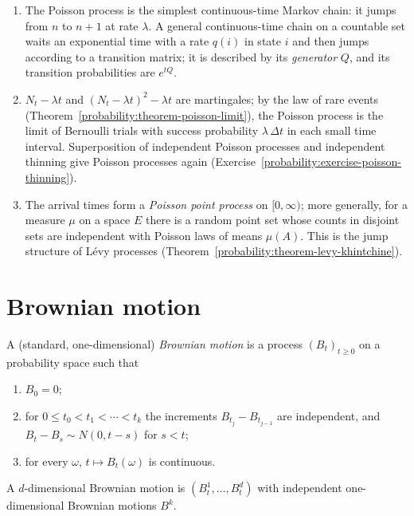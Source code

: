 \begin{remark}\label{martingales:remark-poisson-process}
\begin{enumerate}
\item The Poisson process is the simplest continuous-time Markov chain: it jumps from $n$ to $n + 1$ at rate $\lambda$. A general continuous-time chain on a countable set waits an exponential time with a rate $q(i)$ in state $i$ and
then jumps according to a transition matrix; it is described by its \emph{generator} $Q$, and its transition probabilities are $e^{tQ}$.
\item $N_t - \lambda t$ and $(N_t - \lambda t)^2 - \lambda t$ are martingales; by the law of rare events (Theorem~\ref{probability:theorem-poisson-limit}), the Poisson process is the limit of Bernoulli trials with success probability
$\lambda\,\Delta t$ in each small time interval. Superposition of independent Poisson processes and independent thinning give Poisson processes again (Exercise~\ref{probability:exercise-poisson-thinning}).
\item The arrival times form a \emph{Poisson point process} on $[0, \infty)$; more generally, for a measure $\mu$ on a space $E$ there is a random point set whose counts in disjoint sets are independent with Poisson laws of means
$\mu(A)$. This is the jump structure of L\'evy processes (Theorem~\ref{probability:theorem-levy-khintchine}).
\end{enumerate}
\end{remark}

\section{Brownian motion}\label{martingales:section-brownian-motion}

\begin{definition}\label{martingales:definition-brownian-motion}
A (standard, one-dimensional) \emph{Brownian motion} is a process $(B_t)_{t \geq 0}$ on a probability space such that
\begin{enumerate}
\item $B_0 = 0$;
\item for $0 \leq t_0 < t_1 < \cdots < t_k$ the increments $B_{t_j} - B_{t_{j-1}}$ are independent, and $B_t - B_s \sim N(0, t - s)$ for $s < t$;
\item for every $\omega$, $t \mapsto B_t(\omega)$ is continuous.
\end{enumerate}
A $d$-dimensional Brownian motion is $(B^1_t, \ldots, B^d_t)$ with independent one-dimensional Brownian motions $B^k$.
\end{definition}

